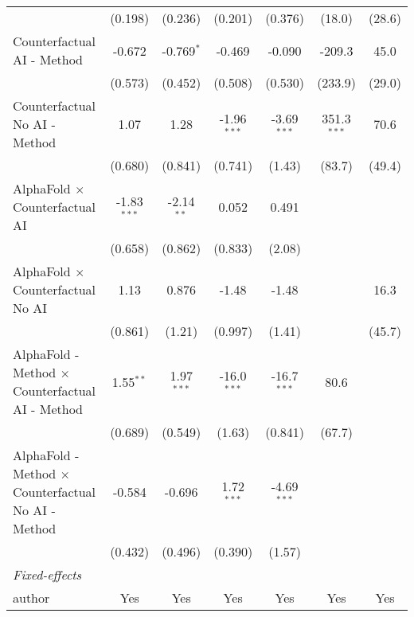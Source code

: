 \begin{tabular}{lcccccc}
                                                              & (0.198)       & (0.236)      & (0.201)       & (0.376)       & (18.0)        & (28.6)\\   
   Counterfactual AI - Method                                 & -0.672        & -0.769$^{*}$ & -0.469        & -0.090        & -209.3        & 45.0\\   
                                                              & (0.573)       & (0.452)      & (0.508)       & (0.530)       & (233.9)       & (29.0)\\   
   Counterfactual No AI - Method                              & 1.07          & 1.28         & -1.96$^{***}$ & -3.69$^{***}$ & 351.3$^{***}$ & 70.6\\   
                                                              & (0.680)       & (0.841)      & (0.741)       & (1.43)        & (83.7)        & (49.4)\\   
   AlphaFold $\times$ Counterfactual AI                       & -1.83$^{***}$ & -2.14$^{**}$ & 0.052         & 0.491         &               &   \\   
                                                              & (0.658)       & (0.862)      & (0.833)       & (2.08)        &               &   \\   
   AlphaFold $\times$ Counterfactual No AI                    & 1.13          & 0.876        & -1.48         & -1.48         &               & 16.3\\   
                                                              & (0.861)       & (1.21)       & (0.997)       & (1.41)        &               & (45.7)\\   
   AlphaFold - Method $\times$ Counterfactual AI - Method     & 1.55$^{**}$   & 1.97$^{***}$ & -16.0$^{***}$ & -16.7$^{***}$ & 80.6          &   \\   
                                                              & (0.689)       & (0.549)      & (1.63)        & (0.841)       & (67.7)        &   \\   
   AlphaFold - Method $\times$ Counterfactual No AI - Method  & -0.584        & -0.696       & 1.72$^{***}$  & -4.69$^{***}$ &               &   \\   
                                                              & (0.432)       & (0.496)      & (0.390)       & (1.57)        &               &   \\   
   \midrule
   \emph{Fixed-effects}\\
   author                                                     & Yes           & Yes          & Yes           & Yes           & Yes           & Yes\\  

\end{tabular}

